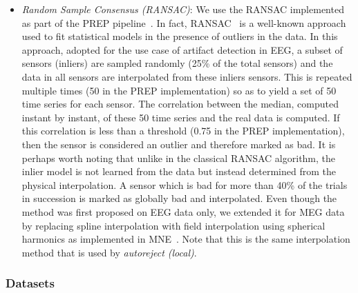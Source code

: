 \begin{itemize}[noitemsep,nolistsep]
\item \emph{Random Sample Consensus (RANSAC)}: We use the RANSAC implemented as part of the PREP pipeline~\citep{bigdely2015prep}. In fact, RANSAC~\citep{fischler1981random} is a well-known approach used to fit statistical models in the presence of outliers in the data. In this approach, adopted for the use case of artifact detection in EEG, a subset of sensors (inliers) are sampled randomly (25\% of the total sensors) and the data in all sensors are interpolated from these inliers sensors. This is repeated multiple times (50 in the PREP implementation) so as to yield a set of 50 time series for each sensor. The correlation between the median, computed instant by instant, of these 50 time series and the real data is computed. If this correlation is less than a threshold (0.75 in the PREP implementation), then the sensor is considered an outlier and therefore marked as bad. It is perhaps worth noting that unlike in the classical RANSAC algorithm, the inlier model is not learned from the data but instead determined from the physical interpolation. A sensor which is bad for more than 40\% of the trials in succession is marked as globally bad and interpolated. Even though the method was first proposed on EEG data only, we extended it for MEG data by replacing spline interpolation with field interpolation using spherical harmonics as implemented in MNE~\citep{gramfort2013meg,hamalainen1994interpreting}. Note that this is the same interpolation method that is used by \emph{autoreject (local)}.
\end{itemize}

\subsubsection{Datasets}
\label{sec:datasets}

\begin{table}[!t]
{
    \caption{Overview of datasets analyzed\label{tab:datasets}}
    \label{table:datasets}
}
\end{table}

